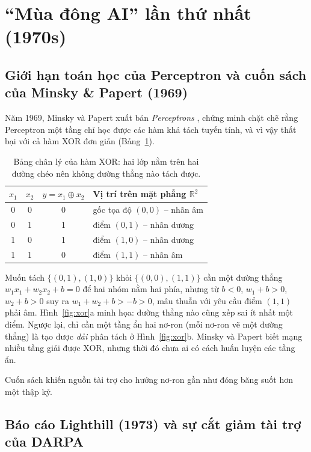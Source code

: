 \section{“Mùa đông AI” lần thứ nhất (1970s)}

\subsection{Giới hạn toán học của Perceptron và cuốn sách của Minsky \& Papert (1969)}

Năm 1969, Minsky và Papert xuất bản \emph{Perceptrons} \cite{minsky1969}, chứng minh chặt chẽ rằng Perceptron một tầng
chỉ học được các hàm khả tách tuyến tính, và vì vậy thất bại với cả hàm XOR đơn giản (Bảng~\ref{tab:xor}).

\begin{table}[H]\centering
\caption{Bảng chân lý của hàm XOR: hai lớp nằm trên hai đường chéo nên không đường thẳng nào tách được.}\label{tab:xor}
\begin{tabular}{cccl}
\toprule
$x_1$ & $x_2$ & $y = x_1 \oplus x_2$ & Vị trí trên mặt phẳng $\mathbb{R}^2$ \\
\midrule
0 & 0 & 0 & gốc tọa độ $(0, 0)$ -- nhãn âm \\
0 & 1 & 1 & điểm $(0, 1)$ -- nhãn dương \\
1 & 0 & 1 & điểm $(1, 0)$ -- nhãn dương \\
1 & 1 & 0 & điểm $(1, 1)$ -- nhãn âm \\
\bottomrule
\end{tabular}
\end{table}

Muốn tách $\{(0,1), (1,0)\}$ khỏi $\{(0,0), (1,1)\}$ cần một đường thẳng $w_1x_1 + w_2x_2 + b = 0$ để hai nhóm nằm hai
phía, nhưng từ $b < 0$, $w_1 + b > 0$, $w_2 + b > 0$ suy ra $w_1 + w_2 + b > -b > 0$, mâu thuẫn với yêu cầu điểm
$(1,1)$ phải âm. Hình~\ref{fig:xor}a minh họa: đường thẳng nào cũng xếp sai ít nhất một điểm. Ngược lại, chỉ cần một
tầng ẩn hai nơ-ron (mỗi nơ-ron vẽ một đường thẳng) là tạo được \emph{dải} phân tách ở Hình~\ref{fig:xor}b. Minsky và
Papert biết mạng nhiều tầng giải được XOR, nhưng thời đó chưa ai có cách huấn luyện các tầng ẩn.

 Cuốn sách khiến nguồn tài trợ cho hướng nơ-ron gần như đóng băng suốt hơn một thập kỷ.

\subsection{Báo cáo Lighthill (1973) và sự cắt giảm tài trợ của DARPA}

